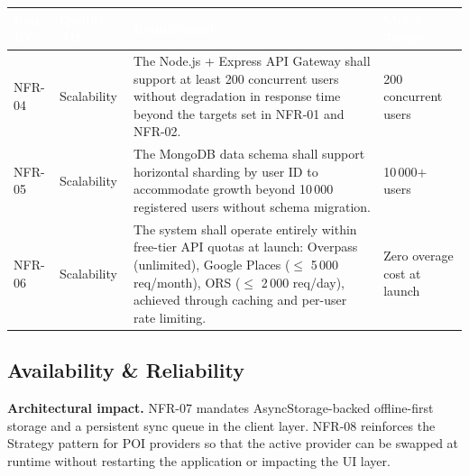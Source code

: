 \documentclass[12pt, a4paper]{article}
\newcommand{\reqid}[1]{\textsc{\small #1}}
\newcommand{\thcell}[1]{\textcolor{white}{\textbf{\small #1}}}
\begin{document}
\vspace{0.4em}
\begin{longtable}{C{1.5cm} C{2.4cm} L{7.0cm} C{2.7cm}}
\toprule
{}
\thcell{Req ID} & \thcell{Quality Attr.} & \thcell{Requirement} & \thcell{Metric / Target} \\
\midrule
\endhead
\bottomrule
\endfoot

\reqid{NFR-04} & Scalability &
The Node.js + Express API Gateway shall support at least 200 concurrent users without degradation in response time beyond the targets set in NFR-01 and NFR-02. &
200 concurrent users \\

\reqid{NFR-05} & Scalability &
The MongoDB data schema shall support horizontal sharding by user ID to accommodate growth beyond 10\,000 registered users without schema migration. &
10\,000$+$ users \\

\reqid{NFR-06} & Scalability &
The system shall operate entirely within free-tier API quotas at launch: Overpass (unlimited), Google Places ($\leq$ 5\,000 req/month), ORS ($\leq$ 2\,000 req/day), achieved through caching and per-user rate limiting. &
Zero overage cost at launch \\

\end{longtable}

\subsection{Availability \& Reliability}

\begin{tcolorbox}[notebox]
  \textbf{Architectural impact.} NFR-07 mandates AsyncStorage-backed offline-first storage and a persistent sync queue in the client layer. NFR-08 reinforces the Strategy pattern for POI providers so that the active provider can be swapped at runtime without restarting the application or impacting the UI layer.
\end{tcolorbox}
\end{document}
